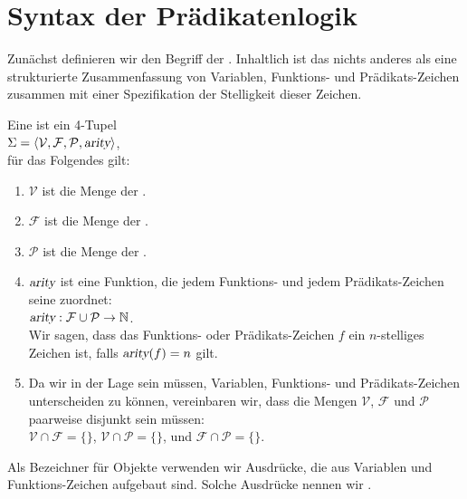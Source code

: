 \section{Syntax der Prädikatenlogik}
Zunächst definieren wir den Begriff der .  Inhaltlich ist das nichts anderes als eine 
strukturierte Zusammenfassung von Variablen, Funktions- und Prädikats-Zeichen zusammen mit
einer Spezifikation der Stelligkeit dieser Zeichen.
 
\begin{Definition}[Signatur]
  Eine  ist ein 4-Tupel \\[0.2cm]
  \hspace*{1.3cm} $\Sigma = \langle \mathcal{V}, \mathcal{F}, \mathcal{P}, \textsl{arity} \rangle$, \\[0.2cm]
  für das Folgendes gilt: 
  \begin{enumerate}
  \item $\mathcal{V}$ ist die Menge der .
  \item $\mathcal{F}$ ist die Menge der .
  \item $\mathcal{P}$ ist die Menge der .
  \item $\textsl{arity}$ ist eine Funktion, die jedem Funktions- und jedem Prädikats-Zeichen seine
         zuordnet: \\[0.2cm]
        \hspace*{1.3cm} $\textsl{arity}: \mathcal{F} \cup \mathcal{P} \rightarrow \mathbb{N}$. \\[0.2cm]
        Wir sagen, dass das Funktions- oder Prädikats-Zeichen $f$ ein
        $n$-stelliges Zeichen ist, falls $\textsl{arity}(f) = n$ gilt.
  \item Da wir in der Lage sein müssen, Variablen, Funktions- und Prädikats-Zeichen
        unterscheiden zu können, vereinbaren wir, dass die Mengen $\mathcal{V}$,
        $\mathcal{F}$ und $\mathcal{P}$ paarweise disjunkt sein müssen: \\[0.2cm] 
        \hspace*{1.3cm} $\mathcal{V} \cap \mathcal{F} = \{\}$, \quad
                        $\mathcal{V} \cap \mathcal{P} = \{\}$, \quad und \quad
                        $\mathcal{F} \cap \mathcal{P} = \{\}$. \eox
  \end{enumerate}
\end{Definition}

\noindent
Als Bezeichner für Objekte verwenden wir Ausdrücke, die aus Variablen und
Funktions-Zeichen aufgebaut sind.  Solche Ausdrücke nennen wir .  

